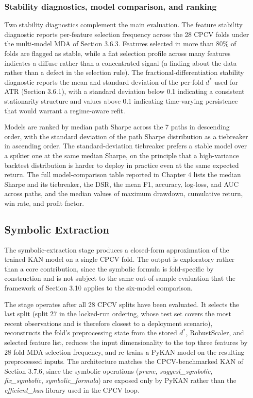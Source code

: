 \documentclass[12pt,a4paper,oneside]{article}
\begin{document}
\subsubsection{Stability diagnostics, model comparison, and ranking}\label{subsubsec:stability_ranking}

Two stability diagnostics complement the main evaluation. The feature stability diagnostic reports per-feature selection frequency across the 28 CPCV folds under the multi-model MDA of Section 3.6.3. Features selected in more than 80\% of folds are flagged as stable, while a flat selection profile across many features indicates a diffuse rather than a concentrated signal (a finding about the data rather than a defect in the selection rule). The fractional-differentiation stability diagnostic reports the mean and standard deviation of the per-fold $d^{\ast}$ used for ATR (Section 3.6.1), with a standard deviation below 0.1 indicating a consistent stationarity structure and values above 0.1 indicating time-varying persistence that would warrant a regime-aware refit.

Models are ranked by median path Sharpe across the 7 paths in descending order, with the standard deviation of the path Sharpe distribution as a tiebreaker in ascending order. The standard-deviation tiebreaker prefers a stable model over a spikier one at the same median Sharpe, on the principle that a high-variance backtest distribution is harder to deploy in practice even at the same expected return. The full model-comparison table reported in Chapter 4 lists the median Sharpe and its tiebreaker, the DSR, the mean F1, accuracy, log-loss, and AUC across paths, and the median values of maximum drawdown, cumulative return, win rate, and profit factor.


\subsection{Symbolic Extraction}\label{subsec:symbolic}

The symbolic-extraction stage produces a closed-form approximation of the trained KAN model \citep{liu_kan_2024} on a single CPCV fold. The output is exploratory rather than a core contribution, since the symbolic formula is fold-specific by construction and is not subject to the same out-of-sample evaluation that the framework of Section 3.10 applies to the six-model comparison.

The stage operates after all 28 CPCV splits have been evaluated. It selects the last split (split 27 in the locked-run ordering, whose test set covers the most recent observations and is therefore closest to a deployment scenario), reconstructs the fold's preprocessing state from the stored $d^{\ast}$, RobustScaler, and selected feature list, reduces the input dimensionality to the top three features by 28-fold MDA selection frequency, and re-trains a PyKAN model on the resulting preprocessed inputs. The architecture matches the CPCV-benchmarked KAN of Section 3.7.6, since the symbolic operations (\textit{prune}, \textit{suggest\_symbolic}, \textit{fix\_symbolic}, \textit{symbolic\_formula}) are exposed only by PyKAN rather than the \textit{efficient\_kan} library used in the CPCV loop.
\end{document}
